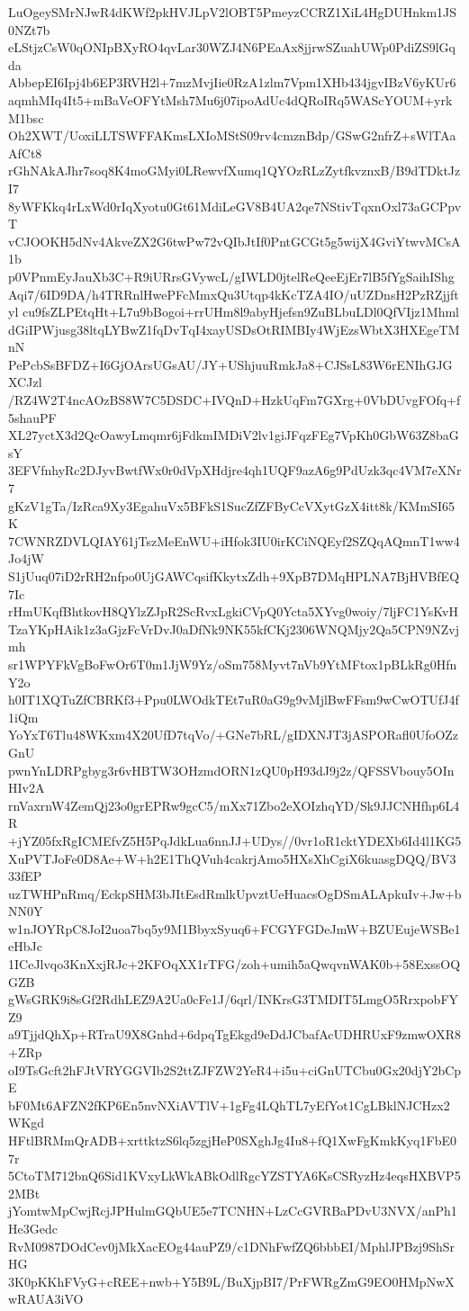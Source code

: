 LuOgeySMrNJwR4dKWf2pkHVJLpV2lOBT5PmeyzCCRZ1XiL4HgDUHnkm1JS0NZt7b
eLStjzCsW0qONIpBXyRO4qvLar30WZJ4N6PEaAx8jjrwSZuahUWp0PdiZS9lGqda
AbbepEI6Ipj4b6EP3RVH2l+7mzMvjIie0RzA1zlm7Vpm1XHb434jgvIBzV6yKUr6
aqmhMIq4It5+mBaVeOFYtMsh7Mu6j07ipoAdUc4dQRoIRq5WAScYOUM+yrkM1bsc
Oh2XWT/UoxiLLTSWFFAKmsLXIoMStS09rv4cmznBdp/GSwG2nfrZ+sWlTAaAfCt8
rGhNAkAJhr7soq8K4moGMyi0LRewvfXumq1QYOzRLzZytfkvznxB/B9dTDktJzI7
8yWFKkq4rLxWd0rIqXyotu0Gt61MdiLeGV8B4UA2qe7NStivTqxnOxl73aGCPpvT
vCJOOKH5dNv4AkveZX2G6twPw72vQIbJtIf0PntGCGt5g5wijX4GviYtwvMCsA1b
p0VPnmEyJauXb3C+R9iURrsGVywcL/gIWLD0jtelReQeeEjEr7lB5fYgSaihIShg
Aqi7/6ID9DA/h4TRRnlHwePFcMmxQu3Utqp4kKcTZA4IO/uUZDnsH2PzRZjjftyl
cu9fsZLPEtqHt+L7u9bBogoi+rrUHm8l9abyHjefsn9ZuBLbuLDl0QfVIjz1Mhml
dGiIPWjusg38ltqLYBwZ1fqDvTqI4xayUSDsOtRIMBIy4WjEzsWbtX3HXEgeTMnN
PePcbSsBFDZ+I6GjOArsUGsAU/JY+UShjuuRmkJa8+CJSsL83W6rENIhGJGXCJzl
/RZ4W2T4ncAOzBS8W7C5DSDC+IVQnD+HzkUqFm7GXrg+0VbDUvgFOfq+f5shauPF
XL27yctX3d2QcOawyLmqmr6jFdkmIMDiV2lv1giJFqzFEg7VpKh0GbW63Z8baGsY
3EFVfnhyRc2DJyvBwtfWx0r0dVpXHdjre4qh1UQF9azA6g9PdUzk3qc4VM7eXNr7
gKzV1gTa/IzRca9Xy3EgahuVx5BFkS1SucZfZFByCcVXytGzX4itt8k/KMmSI65K
7CWNRZDVLQIAY61jTszMeEnWU+iHfok3IU0irKCiNQEyf2SZQqAQmnT1ww4Jo4jW
S1jUuq07iD2rRH2nfpo0UjGAWCqsifKkytxZdh+9XpB7DMqHPLNA7BjHVBfEQ7Ic
rHmUKqfBhtkovH8QYlzZJpR2ScRvxLgkiCVpQ0Ycta5XYvg0woiy/7ljFC1YsKvH
TzaYKpHAik1z3aGjzFcVrDvJ0aDfNk9NK55kfCKj2306WNQMjy2Qa5CPN9NZvjmh
sr1WPYFkVgBoFwOr6T0m1JjW9Yz/oSm758Myvt7nVb9YtMFtox1pBLkRg0HfnY2o
h0IT1XQTuZfCBRKf3+Ppu0LWOdkTEt7uR0aG9g9vMjlBwFFsm9wCwOTUfJ4f1iQm
YoYxT6Tlu48WKxm4X20UfD7tqVo/+GNe7bRL/gIDXNJT3jASPORafl0UfoOZzGnU
pwnYnLDRPgbyg3r6vHBTW3OHzmdORN1zQU0pH93dJ9j2z/QFSSVbouy5OInHIv2A
rnVaxrnW4ZemQj23o0grEPRw9gcC5/mXx71Zbo2eXOIzhqYD/Sk9JJCNHfhp6L4R
+jYZ05fxRgICMEfvZ5H5PqJdkLua6nnJJ+UDys//0vr1oR1cktYDEXb6Id4l1KG5
XuPVTJoFe0D8Ae+W+h2E1ThQVuh4cakrjAmo5HXsXhCgiX6kuasgDQQ/BV333fEP
uzTWHPnRmq/EckpSHM3bJItEsdRmlkUpvztUeHuacsOgDSmALApkuIv+Jw+bNN0Y
w1nJOYRpC8JoI2uoa7bq5y9M1BbyxSyuq6+FCGYFGDeJmW+BZUEujeWSBe1eHbJc
1ICeJlvqo3KnXxjRJc+2KFOqXX1rTFG/zoh+umih5aQwqvnWAK0b+58ExssOQGZB
gWsGRK9i8sGf2RdhLEZ9A2Ua0cFe1J/6qrl/INKrsG3TMDIT5LmgO5RrxpobFYZ9
a9TjjdQhXp+RTraU9X8Gnhd+6dpqTgEkgd9eDdJCbafAcUDHRUxF9zmwOXR8+ZRp
oI9TsGcft2hFJtVRYGGVIb2S2ttZJFZW2YeR4+i5u+ciGnUTCbu0Gx20djY2bCpE
bF0Mt6AFZN2fKP6En5nvNXiAVTlV+1gFg4LQhTL7yEfYot1CgLBklNJCHzx2WKgd
HFtlBRMmQrADB+xrttktzS6lq5zgjHeP0SXghJg4Iu8+fQ1XwFgKmkKyq1FbE07r
5CtoTM712bnQ6Sid1KVxyLkWkABkOdlRgcYZSTYA6KsCSRyzHz4eqsHXBVP52MBt
jYomtwMpCwjRcjJPHulmGQbUE5e7TCNHN+LzCcGVRBaPDvU3NVX/anPh1He3Gedc
RvM0987DOdCev0jMkXacEOg44auPZ9/c1DNhFwfZQ6bbbEI/MphlJPBzj9ShSrHG
3K0pKKhFVyG+cREE+nwb+Y5B9L/BuXjpBI7/PrFWRgZmG9EO0HMpNwXwRAUA3iVO

